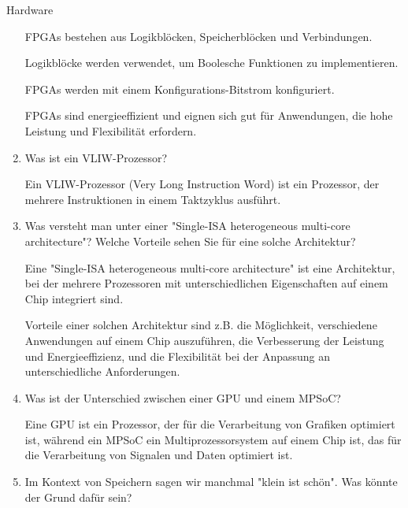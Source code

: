 \documentclass{article}
\begin{document}
\begin{exercise}{Hardware}
\begin{enumerate}
          \begin{solution}
            FPGAs bestehen aus Logikblöcken, Speicherblöcken und Verbindungen.

            Logikblöcke werden verwendet, um Boolesche Funktionen zu implementieren.

            FPGAs werden mit einem Konfigurations-Bitstrom konfiguriert.

            FPGAs sind energieeffizient und eignen sich gut für Anwendungen, die hohe Leistung und Flexibilität erfordern.
          \end{solution}

    \item Was ist ein VLIW-Prozessor?

          \begin{solution}
            Ein VLIW-Prozessor (Very Long Instruction Word) ist ein Prozessor, der mehrere Instruktionen in einem Taktzyklus ausführt.
          \end{solution}

    \item Was versteht man unter einer "Single-ISA heterogeneous multi-core architecture"? Welche Vorteile sehen Sie für eine solche Architektur?

          \begin{solution}
            Eine "Single-ISA heterogeneous multi-core architecture" ist eine Architektur, bei der mehrere Prozessoren mit unterschiedlichen Eigenschaften auf einem Chip integriert sind.

            Vorteile einer solchen Architektur sind z.B. die Möglichkeit, verschiedene Anwendungen auf einem Chip auszuführen, die Verbesserung der Leistung und Energieeffizienz, und die Flexibilität bei der Anpassung an unterschiedliche Anforderungen.
          \end{solution}

    \item Was ist der Unterschied zwischen einer GPU und einem MPSoC?

          \begin{solution}
            Eine GPU ist ein Prozessor, der für die Verarbeitung von Grafiken optimiert ist, während ein MPSoC ein Multiprozessorsystem auf einem Chip ist, das für die Verarbeitung von Signalen und Daten optimiert ist.
          \end{solution}

    \item Im Kontext von Speichern sagen wir manchmal "klein ist schön". Was könnte der Grund dafür sein?


\end{enumerate}
\end{exercise}
\end{document}
